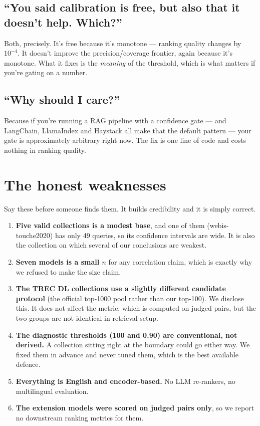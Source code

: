 \documentclass[11pt,a4paper]{article}
\begin{document}
\subsection*{``You said calibration is free, but also that it doesn't help. Which?''}
Both, precisely. It's free because it's monotone --- ranking quality changes by
$10^{-4}$. It doesn't improve the precision/coverage frontier, again because it's
monotone. What it fixes is the \emph{meaning} of the threshold, which is what matters
if you're gating on a number.

\subsection*{``Why should I care?''}
Because if you're running a RAG pipeline with a confidence gate --- and LangChain,
LlamaIndex and Haystack all make that the default pattern --- your gate is
approximately arbitrary right now. The fix is one line of code and costs nothing in
ranking quality.

\section{The honest weaknesses}\label{sec:weak}

Say these before someone finds them. It builds credibility and it is simply correct.

\begin{enumerate}[leftmargin=*]
  \item \textbf{Five valid collections is a modest base}, and one of them
  (webis-touche2020) has only 49 queries, so its confidence intervals are wide. It is
  also the collection on which several of our conclusions are weakest.
  \item \textbf{Seven models is a small $n$} for any correlation claim, which is
  exactly why we refused to make the size claim.
  \item \textbf{The TREC DL collections use a slightly different candidate protocol}
  (the official top-1000 pool rather than our top-100). We disclose this. It does not
  affect the metric, which is computed on judged pairs, but the two groups are not
  identical in retrieval setup.
  \item \textbf{The diagnostic thresholds (100 and 0.90) are conventional, not
  derived.} A collection sitting right at the boundary could go either way. We fixed
  them in advance and never tuned them, which is the best available defence.
  \item \textbf{Everything is English and encoder-based.} No LLM re-rankers, no
  multilingual evaluation.
  \item \textbf{The extension models were scored on judged pairs only}, so we report
  no downstream ranking metrics for them.
\end{enumerate}
\end{document}
